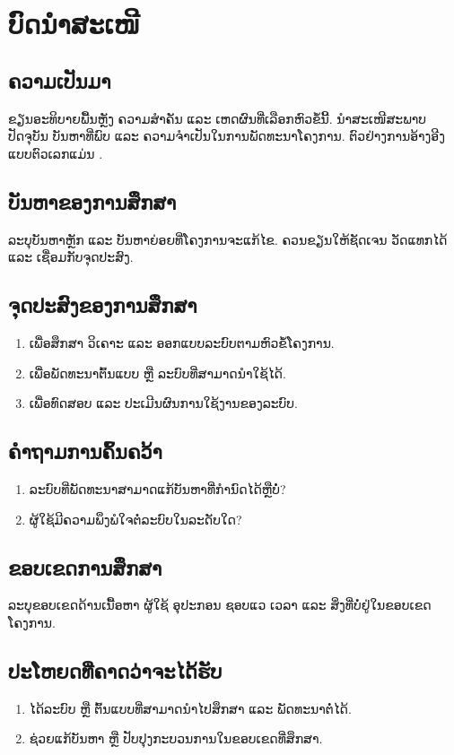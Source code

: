 \chapter{ບົດນຳສະເໜີ}

\section{ຄວາມເປັນມາ}
ຂຽນອະທິບາຍພື້ນຫຼັງ ຄວາມສຳຄັນ ແລະ ເຫດຜົນທີ່ເລືອກຫົວຂໍ້ນີ້. ນຳສະເໜີສະພາບປັດຈຸບັນ ບັນຫາທີ່ພົບ ແລະ ຄວາມຈຳເປັນໃນການພັດທະນາໂຄງການ. ຕົວຢ່າງການອ້າງອີງແບບຕົວເລກແມ່ນ \cite{lamport1994latex}.

\section{ບັນຫາຂອງການສຶກສາ}
ລະບຸບັນຫາຫຼັກ ແລະ ບັນຫາຍ່ອຍທີ່ໂຄງການຈະແກ້ໄຂ. ຄວນຂຽນໃຫ້ຊັດເຈນ ວັດແທກໄດ້ ແລະ ເຊື່ອມກັບຈຸດປະສົງ.

\section{ຈຸດປະສົງຂອງການສຶກສາ}
\begin{enumerate}
  \item ເພື່ອສຶກສາ ວິເຄາະ ແລະ ອອກແບບລະບົບຕາມຫົວຂໍ້ໂຄງການ.
  \item ເພື່ອພັດທະນາຕົ້ນແບບ ຫຼື ລະບົບທີ່ສາມາດນຳໃຊ້ໄດ້.
  \item ເພື່ອທົດສອບ ແລະ ປະເມີນຜົນການໃຊ້ງານຂອງລະບົບ.
\end{enumerate}

\section{ຄຳຖາມການຄົ້ນຄວ້າ}
\begin{enumerate}
  \item ລະບົບທີ່ພັດທະນາສາມາດແກ້ບັນຫາທີ່ກຳນົດໄດ້ຫຼືບໍ່?
  \item ຜູ້ໃຊ້ມີຄວາມພຶງພໍໃຈຕໍ່ລະບົບໃນລະດັບໃດ?
\end{enumerate}

\section{ຂອບເຂດການສຶກສາ}
ລະບຸຂອບເຂດດ້ານເນື້ອຫາ ຜູ້ໃຊ້ ອຸປະກອນ ຊອບແວ ເວລາ ແລະ ສິ່ງທີ່ບໍ່ຢູ່ໃນຂອບເຂດໂຄງການ.

\section{ປະໂຫຍດທີ່ຄາດວ່າຈະໄດ້ຮັບ}
\begin{enumerate}
  \item ໄດ້ລະບົບ ຫຼື ຕົ້ນແບບທີ່ສາມາດນຳໄປສຶກສາ ແລະ ພັດທະນາຕໍ່ໄດ້.
  \item ຊ່ວຍແກ້ບັນຫາ ຫຼື ປັບປຸງກະບວນການໃນຂອບເຂດທີ່ສຶກສາ.
\end{enumerate}

